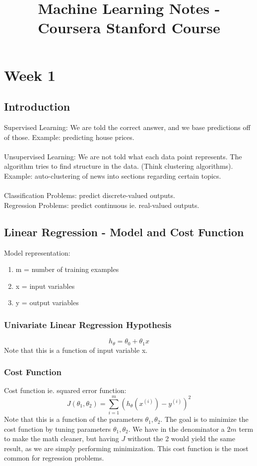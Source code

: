 \documentclass[11pt,letterpaper]{article}
\begin{document}
\title{Machine Learning Notes - Coursera Stanford Course}
\maketitle
\section{Week 1}
\subsection{Introduction}
Supervised Learning: We are told the correct answer, and we base predictions off of those. Example: predicting house prices.\\
\\
Unsupervised Learning: We are not told what each data point represents. The algorithm tries to find structure in the data. (Think clustering algorithms). Example: auto-clustering of news into sections regarding certain topics.\\
\\
Classification Problems: predict discrete-valued outputs.\\
Regression Problems: predict continuous ie. real-valued outputs.

\subsection{Linear Regression - Model and Cost Function}
Model representation:
\begin{enumerate}
	\item m = number of training examples
	\item x = input variables
	\item y = output variables
\end{enumerate}

\subsubsection{Univariate Linear Regression Hypothesis}
$$h_\theta = \theta_0 + \theta_1x$$
Note that this is a function of input variable x.

\subsubsection{Cost Function}
Cost function ie. squared error function:  $$J(\theta_1, \theta_2) = \sum_{i=1}^{m}(h_\theta(x^{(i)})-y^{(i)})^2$$ Note that this is a function of the parameters \(\theta_1, \theta_2\). The goal is to minimize the cost function by tuning parameters \(\theta_1, \theta_2\). We have in the denominator a \(2m\) term to make the math cleaner, but having \(J\) without the 2 would yield the same result, as we are simply performing minimization. This cost function is the most common for regression problems.
\end{document}

